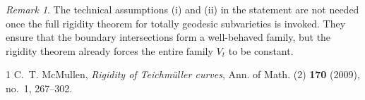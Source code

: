 \documentclass{article}
\theoremstyle{remark}
\newtheorem{remark}[theorem]{Remark}
\begin{document}
\begin{remark}
The technical assumptions (i) and (ii) in the statement are not needed once
the full rigidity theorem for totally geodesic subvarieties is invoked.
They ensure that the boundary intersections form a well-behaved family, but
the rigidity theorem already forces the entire family $V_t$ to be constant.
\end{remark}

\begin{thebibliography}{1}
C.~T. McMullen,
\emph{Rigidity of Teichm\"uller curves},
Ann. of Math. (2) \textbf{170} (2009), no.~1, 267--302.
\end{thebibliography}
\end{document}
